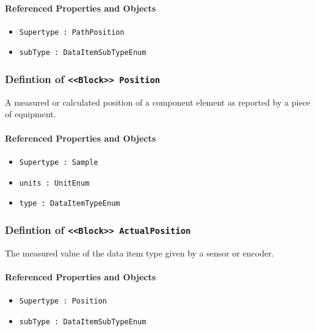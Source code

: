 \FloatBarrier
\paragraph{Referenced Properties and Objects}

\begin{itemize}
\item \texttt{Supertype : PathPosition}

\item \texttt{subType : DataItemSubTypeEnum}

\end{itemize}
\FloatBarrier
\subsubsection{Defintion of \texttt{<<Block>> Position}}
  \label{type:Position}

\FloatBarrier

A measured or calculated position of a component element as reported by a piece of equipment.

\FloatBarrier
\paragraph{Referenced Properties and Objects}

\begin{itemize}
\item \texttt{Supertype : Sample}

\item \texttt{units : UnitEnum}

\item \texttt{type : DataItemTypeEnum}

\end{itemize}
\FloatBarrier
\subsubsection{Defintion of \texttt{<<Block>> ActualPosition}}
  \label{type:ActualPosition}

\FloatBarrier

The measured value of the data item type given by a sensor or encoder.

\FloatBarrier
\paragraph{Referenced Properties and Objects}

\begin{itemize}
\item \texttt{Supertype : Position}

\item \texttt{subType : DataItemSubTypeEnum}

\end{itemize}
\FloatBarrier
